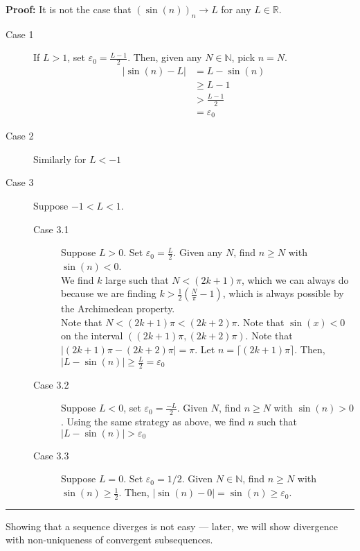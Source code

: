 \documentclass[10pt]{extarticle}
\newcommand{\N}{\mathbb{N}}
\newcommand{\R}{\mathbb{R}}
\begin{document}
      \textbf{Proof:} It is not the case that $\left(\sin(n)\right)_n \rightarrow L$ for any $L\in\R$.
      \begin{description}
        \item[Case 1] If $L > 1$, set $\varepsilon_0 = \frac{L-1}{2}$. Then, given any $N\in\N$, pick $n = N$.
          \begin{align*}
            |\sin(n)-L| &= L-\sin(n)\\
                        &\geq L-1\\
                        &> \frac{L-1}{2}\\
                        &= \varepsilon_0
          \end{align*}
        \item[Case 2] Similarly for $L < -1$
        \item[Case 3] Suppose $-1 < L < 1$.
          \begin{description}
            \item[Case 3.1] Suppose $L > 0$. Set $\varepsilon_0 = \frac{L}{2}$. Given any $N$, find $n \geq N$ with $\sin(n) < 0$. \\

              We find $k$ large such that $N < (2k+1)\pi$, which we can always do because we are finding $k > \frac{1}{2}\left(\frac{N}{\pi} - 1\right)$, which is always possible by the Archimedean property.\\

              Note that $N < (2k+1)\pi < (2k+2)\pi$. Note that $\sin(x) < 0$ on the interval $((2k+1)\pi,(2k+2)\pi)$. Note that $|(2k+1)\pi - (2k+2)\pi| = \pi$. Let $n = \lceil (2k+1)\pi\rceil$. Then, $|L-\sin(n)| \geq \frac{L}{2} = \varepsilon_0$
            \item[Case 3.2] Suppose $L < 0$, set $\varepsilon_0 = \frac{-L}{2}$. Given $N$, find $n \geq N$ with $\sin(n) > 0$. Using the same strategy as above, we find $n$ such that $|L - \sin(n)| > \varepsilon_0$
            \item[Case 3.3] Suppose $L = 0$. Set $\varepsilon_0 = 1/2$. Given $N\in\N$, find $n\geq N$ with $\sin(n) \geq \frac{1}{2}$. Then, $|\sin(n)-0| = \sin(n) \geq \varepsilon_0$.
          \end{description}
      \end{description}
      \begin{center}
        \rule{0.5\textwidth}{0.4pt}
      \end{center}
    Showing that a sequence diverges is not easy --- later, we will show divergence with non-uniqueness of convergent subsequences.
\end{document}
